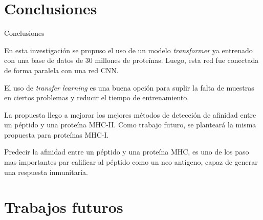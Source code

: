 \documentclass[10pt]{beamer}
\newcommand{\1}{
	\setbeamertemplate{background}{
		\texttt{[image: img/1]}
		\tikz[overlay] \fill[fill opacity=0.75,fill=white] (0,0) rectangle (-\paperwidth,\paperheight);
	}
}
\begin{document}
\section{Conclusiones}


\begin{frame}{Conclusiones}{}
	\begin{block}{}
		En esta investigación se propuso el uso de un modelo \textit{transformer} ya entrenado con una base de datos de 30 millones de proteínas. Luego, esta red fue conectada de forma paralela con una red CNN.
	\end{block}
	
	\begin{block}{}
		El uso de \textit{transfer learning} es una buena opción para suplir la falta de muestras en ciertos problemas y reducir el tiempo de entrenamiento.		
	\end{block}

	\begin{block}{}
		La propuesta llego a mejorar los mejores métodos de detección de afinidad entre un péptido y una proteína MHC-II. Como trabajo futuro, se planteará la misma propuesta para proteínas MHC-I.	
	\end{block}

	\begin{block}{}
		Predecir la afinidad entre un péptido y una proteína MHC, es uno de los paso mas importantes par calificar al péptido como un neo antígeno, capaz de generar una respuesta inmunitaría.
	\end{block}
\end{frame}

\section{Trabajos futuros}
\end{document}
